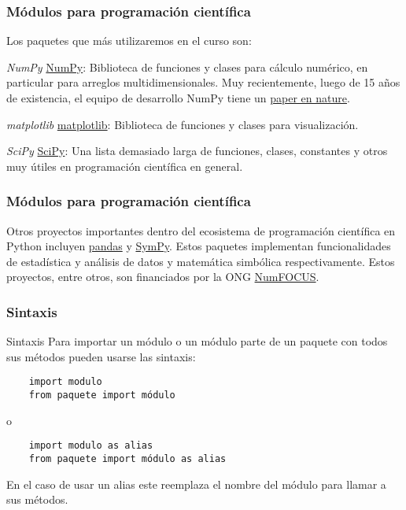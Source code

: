\documentclass{beamer}
\begin{document}
\begin{frame}[fragile]
\frametitle{Módulos para programación científica}
Los paquetes que más utilizaremos en el curso son:
\begin{block}{{\em NumPy}}
\href{https://numpy.org/}{NumPy}:
Biblioteca de funciones y clases para cálculo numérico, en particular para arreglos multidimensionales. Muy recientemente, luego de 15 años de existencia, el equipo de desarrollo NumPy tiene un \href{https://www.nature.com/articles/s41586-020-2649-2}{paper en nature}.
\end{block}
\begin{block}{{\em matplotlib}}
\href{https://matplotlib.org}{matplotlib}:
Biblioteca de funciones y clases para visualización.
\end{block}
\begin{block}{{\em SciPy}}
\href{https://scipy.org}{SciPy}:
Una lista demasiado larga de funciones, clases, constantes y otros muy útiles en programación científica en general.
\end{block}
\end{frame}

\begin{frame}[fragile]
\frametitle{Módulos para programación científica}
Otros proyectos importantes dentro del ecosistema de programación científica en Python incluyen \href{https://pandas.pydata.org/}{pandas} y \href{https://www.sympy.org/en/index.html}{SymPy}. Estos paquetes implementan funcionalidades de estadística y análisis de datos y matemática simbólica respectivamente. Estos proyectos, entre otros, son financiados por la ONG \href{https://numfocus.org/sponsored-projects}{NumFOCUS}.

\end{frame}

\begin{frame}[fragile]
    \frametitle{Sintaxis}
    \begin{block}{Sintaxis}
    Para importar un módulo o un módulo parte de un paquete con todos sus métodos pueden usarse las sintaxis:
    \begin{verbatim}
    import modulo 
    from paquete import módulo
    \end{verbatim}
    o
    \begin{verbatim}
    import modulo as alias
    from paquete import módulo as alias
    \end{verbatim}
    En el caso de usar un alias este reemplaza el nombre del módulo para llamar a sus métodos.
    \end{block}
    \end{frame}
\end{document}
